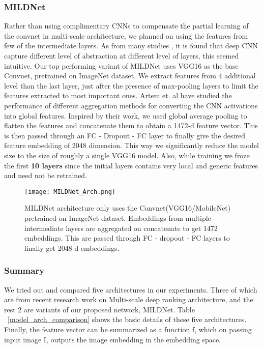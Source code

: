 \documentclass[10pt,twocolumn,letterpaper]{article}
\begin{document}
\subsubsection{MILDNet}
Rather than using complimentary CNNs to compensate the partial learning of the convnet in multi-scale architecture, we planned on using the features from few of the intermediate layers. As from many studies \cite{c6}, it is found that deep CNN capture different level of abstraction at different level of layers, this seemed intuitive. Our top performing variant of MILDNet uses VGG16 as the base Convnet, pretrained on ImageNet dataset. We extract features from 4 additional level than the last layer, just after the presence of max-pooling layers to limit the features extracted to most important ones. Artem et. al \cite{c10} have studied the performance of different aggregation methods for converting the CNN activations into global features. Inspired by their work, we used global average pooling to flatten the features and concatenate them to obtain a 1472-d feature vector. This is then passed through an FC - Dropout - FC layer to finally give the desired feature embedding of 2048 dimension. This way we significantly reduce the model size to the size of roughly a single VGG16 model. Also, while training we froze the first \textbf{10 layers} since the initial layers contains very local and generic features and need not be retrained.
\begin{figure}[hbt!]
\centering
\texttt{[image: MILDNet\_Arch.png]}
\caption{MILDNet architecture only uses the Convnet(VGG16/MobileNet) pretrained on ImageNet dataset. Embeddings from multiple intermediate layers are aggregated on concatenate to get 1472 embeddings. This are passed through FC - dropout - FC layers to finally get 2048-d embeddings.}
\label{fig:MILDNet_arch}
\end{figure}

\subsubsection{Summary}
We tried out and compared five architectures in our experiments. Three of which are from recent research work on Multi-scale deep ranking architecture, and the rest 2 are variants of our proposed network, MILDNet. Table ~\ref{model_arch_comparison} shows the basic details of these five architectures. 
Finally, the feature vector can be summarized as a function f, which on passing input image I, outputs the image embedding  in the embedding space.
\end{document}
